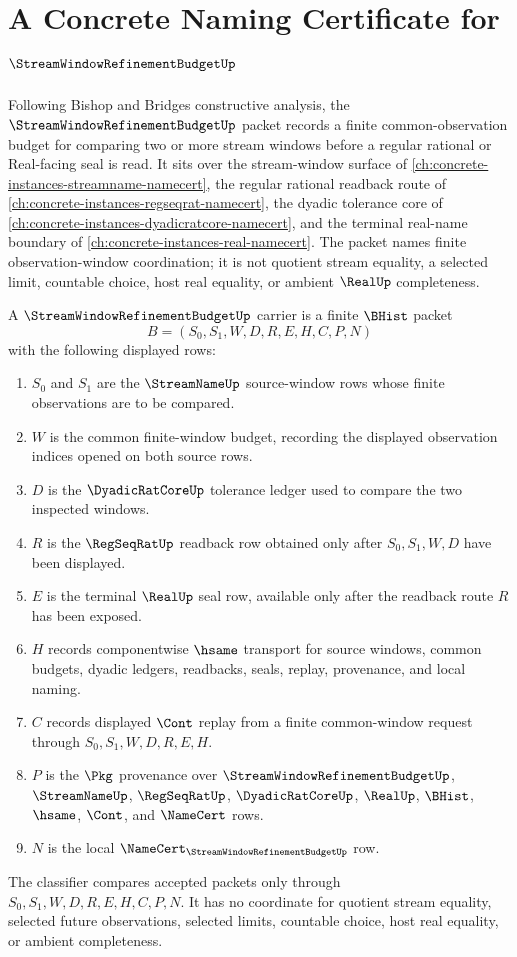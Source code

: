 \chapter{A Concrete Naming Certificate for $\StreamWindowRefinementBudgetUp$}
\label{ch:concrete-instances-stream-window-refinement-budget-namecert}

Following Bishop and Bridges constructive analysis, the $\StreamWindowRefinementBudgetUp$ packet records a finite common-observation budget for comparing two or more stream windows before a regular rational or Real-facing seal is read. It sits over the stream-window surface of \autoref{ch:concrete-instances-streamname-namecert}, the regular rational readback route of \autoref{ch:concrete-instances-regseqrat-namecert}, the dyadic tolerance core of \autoref{ch:concrete-instances-dyadicratcore-namecert}, and the terminal real-name boundary of \autoref{ch:concrete-instances-real-namecert}. The packet names finite observation-window coordination; it is not quotient stream equality, a selected limit, countable choice, host real equality, or ambient $\RealUp$ completeness.

\begin{definition}
\label{def:stream-window-refinement-budget-carrier}
A $\StreamWindowRefinementBudgetUp$ carrier is a finite $\BHist$ packet
$$
B=(S_0,S_1,W,D,R,E,H,C,P,N)
$$
with the following displayed rows:
\begin{enumerate}
\item $S_0$ and $S_1$ are the $\StreamNameUp$ source-window rows whose finite observations are to be compared.
\item $W$ is the common finite-window budget, recording the displayed observation indices opened on both source rows.
\item $D$ is the $\DyadicRatCoreUp$ tolerance ledger used to compare the two inspected windows.
\item $R$ is the $\RegSeqRatUp$ readback row obtained only after $S_0,S_1,W,D$ have been displayed.
\item $E$ is the terminal $\RealUp$ seal row, available only after the readback route $R$ has been exposed.
\item $H$ records componentwise $\hsame$ transport for source windows, common budgets, dyadic ledgers, readbacks, seals, replay, provenance, and local naming.
\item $C$ records displayed $\Cont$ replay from a finite common-window request through $S_0,S_1,W,D,R,E,H$.
\item $P$ is the $\Pkg$ provenance over $\StreamWindowRefinementBudgetUp$, $\StreamNameUp$, $\RegSeqRatUp$, $\DyadicRatCoreUp$, $\RealUp$, $\BHist$, $\hsame$, $\Cont$, and $\NameCert$ rows.
\item $N$ is the local $\NameCert_{\StreamWindowRefinementBudgetUp}$ row.
\end{enumerate}
The classifier compares accepted packets only through $S_0,S_1,W,D,R,E,H,C,P,N$. It has no coordinate for quotient stream equality, selected future observations, selected limits, countable choice, host real equality, or ambient completeness.
\end{definition}

